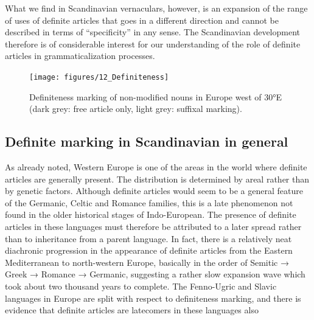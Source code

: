 \z

What we find in Scandinavian vernaculars, however, is an expansion of the range of uses of definite articles that goes in a different direction and cannot be described in terms of “specificity” in any sense. The Scandinavian development therefore is of considerable interest for our understanding of the role of definite articles in grammaticalization processes.

\begin{figure}[h]

\texttt{[image: figures/12\_Definiteness]}
\caption{Definiteness marking of non-modified nouns in Europe west of 30°E (dark grey: free article only, light grey: suffixal marking).}
\label{map:10}
\end{figure}



\subsection{Definite marking in Scandinavian in general}
\label{bkm:Ref224380083}

As already noted, Western Europe is one of the areas in the world where definite articles are generally present. The distribution is determined by areal rather than by genetic factors. Although definite articles would seem to be a general feature of the Germanic, Celtic and Romance families, this is a late phenomenon not found in the older historical stages of Indo-European. The presence of definite articles in these languages must therefore be attributed to a later spread rather than to inheritance from a parent language. In fact, there is a relatively neat diachronic progression in the appearance of definite articles from the Eastern Mediterranean to north-western Europe, basically in the order of Semitic → Greek → Romance → Germanic, suggesting a rather slow expansion wave which took about two thousand years to complete. The Fenno-Ugric and Slavic languages in Europe are split with respect to definiteness marking, and there is evidence that definite articles are latecomers in these languages also

